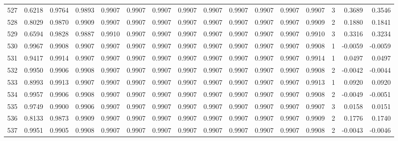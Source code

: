 \begin{tabular}{lrrrrrrrrrrrrrrr}
527 &      0.6218 &  0.9764 &  0.9893 &  0.9907 &  0.9907 &  0.9907 &  0.9907 &  0.9907 &  0.9907 &  0.9907 &   0.9907 &     0.9907 &      3 &                    0.3689 &                     0.3546 \\
528 &      0.8029 &  0.9870 &  0.9909 &  0.9907 &  0.9907 &  0.9907 &  0.9907 &  0.9907 &  0.9907 &  0.9907 &   0.9907 &     0.9909 &      2 &                    0.1880 &                     0.1841 \\
529 &      0.6594 &  0.9828 &  0.9887 &  0.9910 &  0.9907 &  0.9907 &  0.9907 &  0.9907 &  0.9907 &  0.9907 &   0.9907 &     0.9910 &      3 &                    0.3316 &                     0.3234 \\
530 &      0.9967 &  0.9908 &  0.9907 &  0.9907 &  0.9907 &  0.9907 &  0.9907 &  0.9907 &  0.9907 &  0.9907 &   0.9907 &     0.9908 &      1 &                   -0.0059 &                    -0.0059 \\
531 &      0.9417 &  0.9914 &  0.9907 &  0.9907 &  0.9907 &  0.9907 &  0.9907 &  0.9907 &  0.9907 &  0.9907 &   0.9907 &     0.9914 &      1 &                    0.0497 &                     0.0497 \\
532 &      0.9950 &  0.9906 &  0.9908 &  0.9907 &  0.9907 &  0.9907 &  0.9907 &  0.9907 &  0.9907 &  0.9907 &   0.9907 &     0.9908 &      2 &                   -0.0042 &                    -0.0044 \\
533 &      0.8993 &  0.9913 &  0.9907 &  0.9907 &  0.9907 &  0.9907 &  0.9907 &  0.9907 &  0.9907 &  0.9907 &   0.9907 &     0.9913 &      1 &                    0.0920 &                     0.0920 \\
534 &      0.9957 &  0.9906 &  0.9908 &  0.9907 &  0.9907 &  0.9907 &  0.9907 &  0.9907 &  0.9907 &  0.9907 &   0.9907 &     0.9908 &      2 &                   -0.0049 &                    -0.0051 \\
535 &      0.9749 &  0.9900 &  0.9906 &  0.9907 &  0.9907 &  0.9907 &  0.9907 &  0.9907 &  0.9907 &  0.9907 &   0.9907 &     0.9907 &      3 &                    0.0158 &                     0.0151 \\
536 &      0.8133 &  0.9873 &  0.9909 &  0.9907 &  0.9907 &  0.9907 &  0.9907 &  0.9907 &  0.9907 &  0.9907 &   0.9907 &     0.9909 &      2 &                    0.1776 &                     0.1740 \\
537 &      0.9951 &  0.9905 &  0.9908 &  0.9907 &  0.9907 &  0.9907 &  0.9907 &  0.9907 &  0.9907 &  0.9907 &   0.9907 &     0.9908 &      2 &                   -0.0043 &                    -0.0046 \\

\end{tabular}
